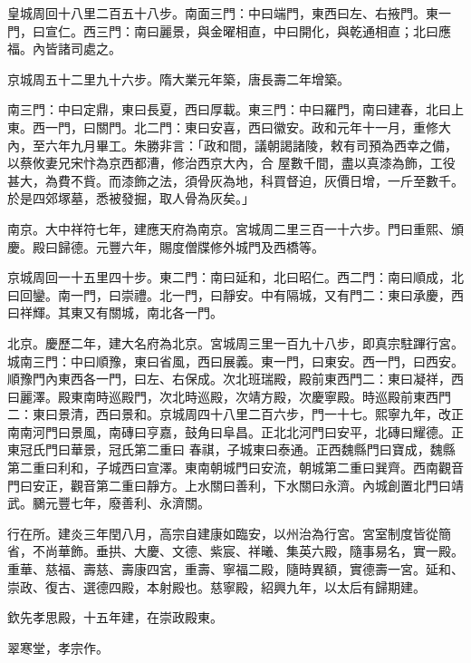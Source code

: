 \begin{pinyinscope}
 皇城周回十八里二百五十八步。南面三門：中曰端門，東西曰左、右掖門。東一門，曰宣仁。西三門：南曰麗景，與金曜相直，中曰開化，與乾通相直；北曰應福。內皆諸司處之。



 京城周五十二里九十六步。隋大業元年築，唐長壽二年增築。



 南三門：中曰定鼎，東曰長夏，西曰厚載。東三門：中曰羅門，南曰建春，北曰上東。西一門，曰關門。北二門：東曰安喜，西曰徽安。政和元年十一月，重修大內，至六年九月畢工。朱勝非言：「政和間，議朝謁諸陵，敕有司預為西幸之備，以蔡攸妻兄宋忭為京西都漕，修治西京大內，合
 屋數千間，盡以真漆為飾，工役甚大，為費不貲。而漆飾之法，須骨灰為地，科買督迫，灰價日增，一斤至數千。於是四郊塚墓，悉被發掘，取人骨為灰矣。」



 南京。大中祥符七年，建應天府為南京。宮城周二里三百一十六步。門曰重熙、頒慶。殿曰歸德。元豐六年，賜度僧牒修外城門及西橋等。



 京城周回一十五里四十步。東二門：南曰延和，北曰昭仁。西二門：南曰順成，北曰回鑾。南一門，曰崇禮。北一門，曰靜安。中有隔城，又有門二：東曰承慶，西曰祥輝。其東又有關城，南北各一門。



 北京。慶歷二年，建大名府為北京。宮城周三里一百九十八步，即真宗駐蹕行宮。城南三門：中曰順豫，東曰省風，西曰展義。東一門，曰東安。西一門，曰西安。順豫門內東西各一門，曰左、右保成。次北班瑞殿，殿前東西門二：東曰凝祥，西曰麗澤。殿東南時巡殿門，次北時巡殿，次靖方殿，次慶寧殿。時巡殿前東西門二：東曰景清，西曰景和。京城周四十八里二百六步，門一十七。熙寧九年，改正南南河門曰景風，南磚曰亨嘉，鼓角曰阜昌。正北北河門曰安平，北磚曰耀德。正東冠氏門曰華景，冠氏第二重曰
 春祺，子城東曰泰通。正西魏縣門曰寶成，魏縣第二重曰利和，子城西曰宣澤。東南朝城門曰安流，朝城第二重曰巽齊。西南觀音門曰安正，觀音第二重曰靜方。上水關曰善利，下水關曰永濟。內城創置北門曰靖武。鵩元豐七年，廢善利、永濟關。



 行在所。建炎三年閏八月，高宗自建康如臨安，以州治為行宮。宮室制度皆從簡省，不尚華飾。垂拱、大慶、文德、紫宸、祥曦、集英六殿，隨事易名，實一殿。重華、慈福、壽慈、壽康四宮，重壽、寧福二殿，隨時異額，實德壽一宮。延和、崇政、復古、選德四殿，本射殿也。慈寧殿，紹興九年，以太后有歸期建。



 欽先孝思殿，十五年建，在崇政殿東。



 翠寒堂，孝宗作。




\end{pinyinscope}
